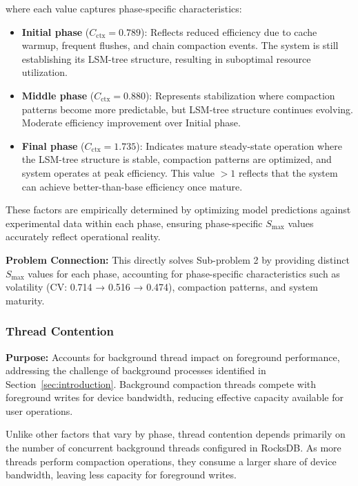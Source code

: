 \documentclass[11pt]{article}
\begin{document}
where each value captures phase-specific characteristics:
\begin{itemize}
    \item \textbf{Initial phase} ($C_{\text{ctx}} = 0.789$): Reflects reduced efficiency due to cache warmup, frequent flushes, and chain compaction events. The system is still establishing its LSM-tree structure, resulting in suboptimal resource utilization.
    
    \item \textbf{Middle phase} ($C_{\text{ctx}} = 0.880$): Represents stabilization where compaction patterns become more predictable, but LSM-tree structure continues evolving. Moderate efficiency improvement over Initial phase.
    
    \item \textbf{Final phase} ($C_{\text{ctx}} = 1.735$): Indicates mature steady-state operation where the LSM-tree structure is stable, compaction patterns are optimized, and system operates at peak efficiency. This value $> 1$ reflects that the system can achieve better-than-base efficiency once mature.
\end{itemize}

These factors are empirically determined by optimizing model predictions against experimental data within each phase, ensuring phase-specific $S_{\max}$ values accurately reflect operational reality.

\textbf{Problem Connection:} This directly solves Sub-problem 2 by providing distinct $S_{\max}$ values for each phase, accounting for phase-specific characteristics such as volatility (CV: 0.714 → 0.516 → 0.474), compaction patterns, and system maturity.

\subsubsection{Thread Contention}
\textbf{Purpose:} Accounts for background thread impact on foreground performance, addressing the challenge of background processes identified in Section~\ref{sec:introduction}. Background compaction threads compete with foreground writes for device bandwidth, reducing effective capacity available for user operations.

Unlike other factors that vary by phase, thread contention depends primarily on the number of concurrent background threads configured in RocksDB. As more threads perform compaction operations, they consume a larger share of device bandwidth, leaving less capacity for foreground writes.
\end{document}
